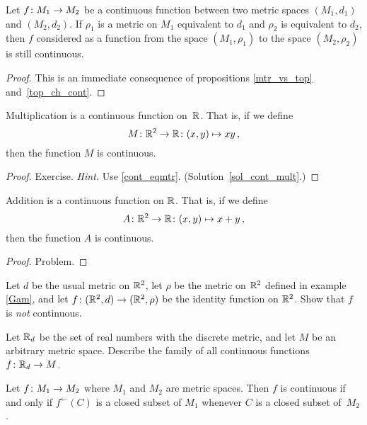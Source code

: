 \begin{prop}\label{cont_eqmtr} Let $f\colon M_1 \rightarrow M_2$ be a continuous function between two
metric spaces $(M_1,d_1)$ and $(M_2,d_2)$.  If $\rho_1$ is a metric on $M_1$ equivalent to $d_1$
and $\rho_2$ is equivalent to $d_2$, then $f$ considered as a function from the space
$(M_1,\rho_1)$ to the space $(M_2,\rho_2)$ is still continuous.
\end{prop}


\begin{proof} This is an immediate consequence of propositions \ref{mtr_vs_top} and~\ref{top_ch_cont}.
\end{proof}

\begin{exam}\label{cont_mult} Multiplication is a continuous function on~$\mathbb{R}$.  That is,
if we define
  \[ M \colon \mathbb{R}^2 \rightarrow \mathbb{R} \colon (x,y) \mapsto xy\,, \]
then the function $M$ is continuous.
\end{exam}

\begin{proof} Exercise.  \emph{Hint.} Use \ref{cont_eqmtr}.   (Solution~\ref{sol_cont_mult}.)  \ns
\end{proof}

\begin{exam}\label{cont_add} Addition is a continuous function on $\mathbb{R}$.  That is, if we define
  \[ A \colon \mathbb{R}^2 \rightarrow \mathbb{R} \colon (x,y) \mapsto x+y\,, \]
then the function $A$ is continuous.
\end{exam}

\begin{proof} Problem.    \ns  \end{proof}

\begin{prob}  Let $d$ be the usual metric on $\mathbb{R}^2$, let $\rho$ be the metric on $\mathbb{R}^2$ defined in
example \ref{Gam}, and let $f\colon (\mathbb{R}^2, d) \rightarrow (\mathbb{R}^2,\rho)$ be the identity function on $\mathbb{R}^2$.
Show that $f$ is \emph{not} continuous.
\end{prob}

\begin{prob} Let $\mathbb{R}_d$ be the set of real numbers with the discrete metric, and let $M$ be an
arbitrary metric space. Describe the family of all continuous functions $f\colon \mathbb{R}_d \rightarrow M$.
\end{prob}

\begin{prop}\label{prop_cont_closed} Let $f\colon M_1 \rightarrow M_2$ where $M_1$ and $M_2$ are metric
spaces.  Then $f$ is continuous if and only if $f^\gets(C)$ is a closed subset of $M_1$ whenever
$C$ is a closed subset of~$M_2$.
\end{prop}

